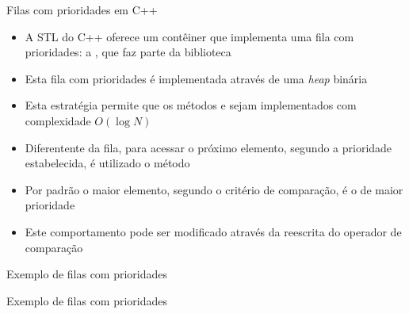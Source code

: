 \begin{frame}[fragile]{Filas com prioridades em C++}

    \begin{itemize}
        \item A STL do C++ oferece um contêiner que implementa uma fila com prioridades: a
            , que faz parte da biblioteca 

        \item Esta fila com prioridades é implementada através de uma \textit{heap} binária

        \item Esta estratégia permite que os métodos  e  sejam
            implementados com complexidade $O(\log N)$

        \item Diferentente da fila, para acessar o próximo elemento, segundo a
            prioridade estabelecida, é utilizado o método 

        \item Por padrão o maior elemento, segundo o critério de comparação, é o de maior 
            prioridade

        \item Este comportamento pode ser modificado através da reescrita do operador de
            comparação
    \end{itemize}

\end{frame}

\begin{frame}[fragile]{Exemplo de filas com prioridades}
\end{frame}

\begin{frame}[fragile]{Exemplo de filas com prioridades}
\end{frame}

